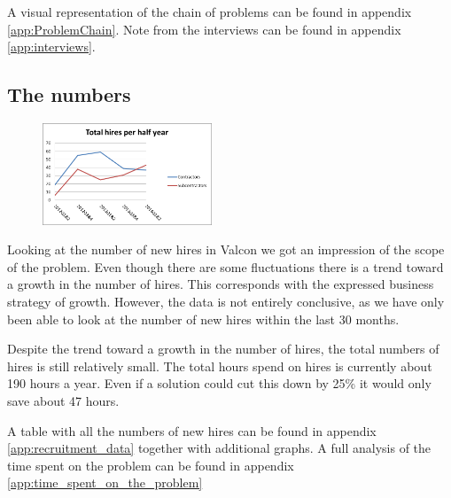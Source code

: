 A visual representation of the chain of problems can be found in appendix \ref{app:ProblemChain}.
Note from the interviews can be found in appendix \ref{app:interviews}.

\subsection{The numbers}
\begin{figure}
\vspace{-20pt}
\centering
\includegraphics[width=0.45\textwidth]{appendix/total_hires_per_half_year.png}
\label{fig:total_hires_per_half_year}
\end{figure}
Looking at the number of new hires in Valcon we got an impression of the scope of the problem.
Even though there are some fluctuations there is a trend toward a growth in the number of hires.
This corresponds with the expressed business strategy of growth.
However, the data is not entirely conclusive, as we have only been able to look at the number of new hires within the last 30 months.

Despite the trend toward a growth in the number of hires, the total numbers of hires is still relatively small.
The total hours spend on hires is currently about 190 hours a year.
Even if a solution could cut this down by 25\% it would only save about 47 hours.

A table with all the numbers of new hires can be found in appendix \ref{app:recruitment_data} together with additional graphs.
A full analysis of the time spent on the problem can be found in appendix \ref{app:time_spent_on_the_problem}
